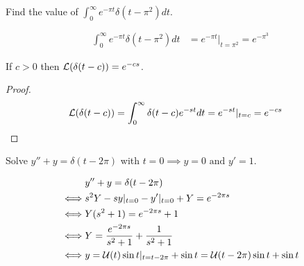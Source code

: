\documentclass[notes]{subfiles}
\begin{document}
\begin{exercise}
    Find the value of $\int_0^\infty e^{-\pi t}\delta(t - \pi^2)dt$.
\end{exercise}
\begin{solution}
    \begin{align*}
        \int_0^\infty e^{-\pi t}\delta(t - \pi^2)dt
        &= e^{-\pi t}|_{t = \pi^2}
        = e^{-\pi^3}
    \end{align*}
\end{solution}

\begin{theorem}
    If $c > 0$ then $\mathcal{L}(\delta(t - c)) = e^{-cs}$.
\end{theorem}
\begin{proof}
    \begin{align*}
        \mathcal{L}(\delta(t - c))
        &= \int_0^\infty \delta(t - c)e^{-st}dt
        = e^{-st}|_{t = c}
        = e^{-cs}
    \end{align*}
\end{proof}

\begin{exercise}
    Solve $y'' + y = \delta(t - 2\pi)$ with $t = 0 \implies y = 0 \text{ and } y' = 1$.
\end{exercise}
\begin{solution}
    \begin{align*}
        &y'' + y = \delta(t - 2\pi) \\
        \iff& s^2 Y - sy|_{t = 0} - y'|_{t = 0} + Y = e^{-2\pi s} \\
        \iff& Y(s^2 + 1) = e^{-2\pi s} + 1 \\
        \iff& Y = \frac{e^{-2\pi s}}{s^2 + 1} + \frac{1}{s^2 + 1} \\
        \iff& y = \mathcal{U}(t)\sin t|_{t = t - 2\pi} + \sin t = \mathcal{U}(t - 2\pi)\sin t + \sin t
    \end{align*}
\end{solution}

\end{document}
